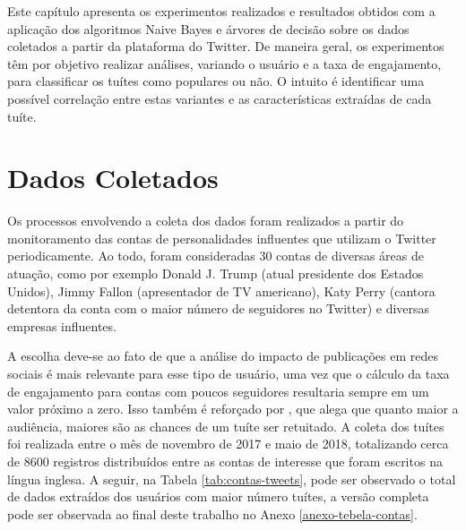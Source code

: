 \documentclass[oneside,openright,12pt]{ufsm_2015} %
\begin{document}
    \par Este capítulo apresenta os experimentos realizados e resultados obtidos com a aplicação dos algoritmos Naive Bayes e árvores de decisão sobre os dados coletados a partir da plataforma do Twitter. De maneira geral, os experimentos têm por objetivo realizar análises, variando o usuário e a taxa de engajamento, para classificar os tuítes como populares ou não. O intuito é identificar uma possível correlação entre estas variantes e as características extraídas de cada tuíte.


\section{Dados Coletados}
\label{sec:exp-dados-coletados}

    \par Os processos envolvendo a coleta dos dados foram realizados a partir do monitoramento das contas de personalidades influentes que utilizam o Twitter periodicamente. Ao todo, foram consideradas 30 contas de diversas áreas de atuação, como por exemplo Donald J. Trump (atual presidente dos Estados Unidos), Jimmy Fallon (apresentador de TV americano), Katy Perry (cantora detentora da conta com o maior número de seguidores no Twitter) e diversas empresas influentes.
    
    \par A escolha deve-se ao fato de que a análise do impacto de publicações em redes sociais é mais relevante para esse tipo de usuário, uma vez que o cálculo da taxa de engajamento para contas com poucos seguidores resultaria sempre em um valor próximo a zero. Isso também é reforçado por \cite{ieee:suh:10}, que alega que quanto maior a audiência, maiores são as chances de um tuíte ser retuitado. A coleta dos tuítes foi realizada entre o mês de novembro de 2017 e maio de 2018, totalizando cerca de 8600 registros distribuídos entre as contas de interesse que foram escritos na língua inglesa. A seguir, na Tabela \ref{tab:contas-tweets}, pode ser observado o total de dados extraídos dos usuários com maior número tuítes, a versão completa pode ser observada ao final deste trabalho no Anexo \ref{anexo-tebela-contas}.
    
\end{document}
